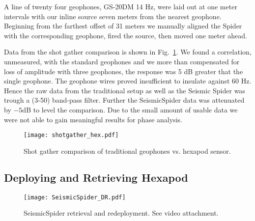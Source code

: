 A line of twenty four geophones, GS-20DM 14 Hz, were laid out at one meter intervals with our inline source seven meters from the nearest geophone. Beginning from the farthest offset of 31 meters we manually aligned the Spider with the corresponding geophone, fired the source, then moved one meter ahead. 

Data from the shot gather comparison is shown in Fig.~\ref{fig:shotgatherHexpod}.
We found a correlation, unmeasured, with the standard geophones and we more than compensated for loss of amplitude with three geophones, the response was 5 dB greater that the single geophone. The geophone wires proved insufficient to insulate against 60 Hz. Hence the raw data from the traditional setup as well as the Seismic Spider was trough a (3-50) band-pass filter. Further the SeismicSpider data was attenuated by $-5$dB to level the comparison.  Due to the small amount of usable data we were not able to gain meaningful results for phase analysis.   

\begin{figure} \centering
  \texttt{[image: shotgather\_hex.pdf]}
 \caption{Shot gather comparison of traditional geophones vs. hexapod sensor. 
 \label{fig:shotgatherHexpod}}
\end{figure}



\subsection{Deploying and Retrieving Hexapod}

\begin{figure} \centering
  \texttt{[image: SeismicSpider\_DR.pdf]}
 \caption{SeismicSpider retrieval and redeployment. See video attachment. 
 \label{fig:SeismicSpiderDR}}
\end{figure}

